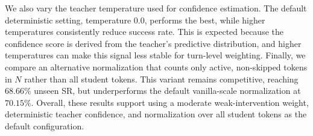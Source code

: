We also vary the teacher temperature used for confidence estimation.
%
The default deterministic setting, temperature $0.0$, performs the best, while higher temperatures consistently reduce success rate.
%
This is expected because the confidence score is derived from the teacher's predictive distribution, and higher temperatures can make this signal less stable for turn-level weighting.
%
Finally, we compare an alternative normalization that counts only active, non-skipped tokens in $N$ rather than all student tokens.
%
This variant remains competitive, reaching $68.66\%$ unseen SR, but underperforms the default vanilla-scale normalization at $70.15\%$.
%
Overall, these results support using a moderate weak-intervention weight, deterministic teacher confidence, and normalization over all student tokens as the default configuration.
%
